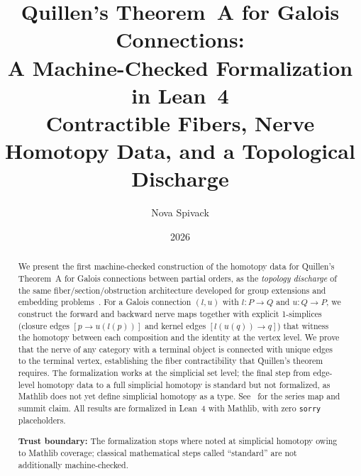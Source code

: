 \documentclass[11pt]{article}
\title{Quillen's Theorem~A for Galois Connections:\\[0.35em]
\large A Machine-Checked Formalization in Lean~4\\[0.2em]
\normalsize Contractible Fibers, Nerve Homotopy Data, and a Topological Discharge}
\author{Nova Spivack}
\date{2026}
\begin{document}
\maketitle
\NovaZenodoAfterTitle


\begin{abstract}
\raggedright
We present the first machine-checked construction of the homotopy data for Quillen's Theorem~A
for Galois connections between partial orders, as the \emph{topology discharge}
of the same fiber/section/obstruction architecture developed for group
extensions and embedding problems~\cite{SpivackFiber}. For a Galois connection
$(l,u)$ with $l : P \to Q$ and $u : Q \to P$, we construct the forward and
backward nerve maps together with explicit 1-simplices (closure edges
$[p \to u(l(p))]$ and kernel edges $[l(u(q)) \to q]$) that witness the
homotopy between each composition and the identity at the vertex level. We
prove that the nerve of any category with a terminal object is connected
with unique edges to the terminal vertex, establishing the fiber
contractibility that Quillen's theorem requires. The formalization works at
the simplicial set level; the final step from edge-level homotopy data to a
full simplicial homotopy is standard but not formalized, as Mathlib does not
yet define simplicial homotopy as a type. See~\cite{SpivackSynthesis,SpivackSummit}
for the series map and summit claim.
All results are formalized in Lean~4 with Mathlib, with
zero \texttt{sorry} placeholders.

\textbf{Trust boundary:} The formalization stops where noted at simplicial homotopy owing to Mathlib coverage; classical mathematical steps called ``standard'' are not additionally machine-checked.
\end{abstract}


\end{document}

